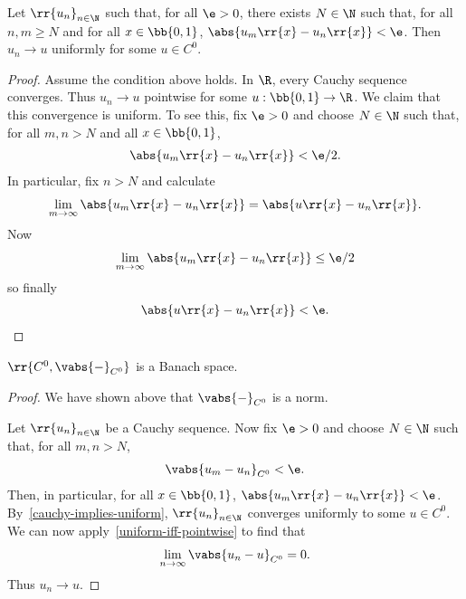 \documentclass{article}
\begin{document}
\begin{lemma} \label{cauchy-implies-uniform}
	Let $ \rr{u_n}_{n\in\N}$ such that, for all $\e>0$, there exists $N\in\N$ such that, for all $n,m\geq N$ and for all
	$x\in \bb{ 0,1 }$, $\abs{u_m \rr{ x } - u_n \rr{ x }} < \e$. Then $u_n\to u$ uniformly for some $u\in C^0$.
	\begin{proof}
		Assume the condition above holds. In $\R$, every Cauchy sequence converges. Thus $u_n\to u$
		pointwise for some $u: \bb{ 0,1 }\to \R$. We claim that this convergence is uniform.
		To see this, fix $\e > 0$ and choose $N\in\N$ such that, for all $m,n>N$ and all $x\in \bb{ 0,1 }$,
		\begin{align*}
			\abs{u_m \rr{ x } - u_n \rr{ x }} < \e/2.
		\end{align*}
		In particular, fix $n>N$ and calculate
		\begin{align*}
			\lim_{m\to\infty} \abs{ u_m \rr{ x } - u_n \rr{ x }} = \abs{ u \rr{ x } - u_n \rr{ x } }.
		\end{align*}
		Now
		\begin{align*}
			\lim_{m\to\infty} \abs{ u_m \rr{ x } - u_n \rr{ x }} \leq \e / 2
		\end{align*}
		so finally
		\begin{align*}
			\abs{u \rr{ x } - u_n \rr{ x }} < \e.
		\end{align*}

	\end{proof}
\end{lemma}

\begin{claim*}[7]
	$ \rr{ C^0, \vabs{-}_{C^0} }$ is a Banach space.
	\begin{proof}
		We have shown above that $\vabs{-}_{C^0}$ is a norm.

		Let $ \rr{u_n}_{n\in\N}$ be a Cauchy sequence. Now fix $\e>0$ and choose $N\in\N$
		such that, for all $m,n>N$,
		\begin{align*}
			\vabs{u_m - u_n}_{C^0}<\e.
		\end{align*}
		Then, in particular, for all $x\in \bb{ 0,1 }$, $\abs{u_m \rr{ x } - u_n \rr{ x }}<\e$.
		By~\ref{cauchy-implies-uniform}, $ \rr{u_n}_{n\in\N}$ converges uniformly to some $u\in C^0$.
		We can now apply~\ref{uniform-iff-pointwise} to find that
		\begin{align*}
			\lim_{n\to\infty} \vabs{u_n-u}_{C^0} = 0.
		\end{align*}
		Thus $u_n\to u$.
	\end{proof}
\end{claim*}
\end{document}
